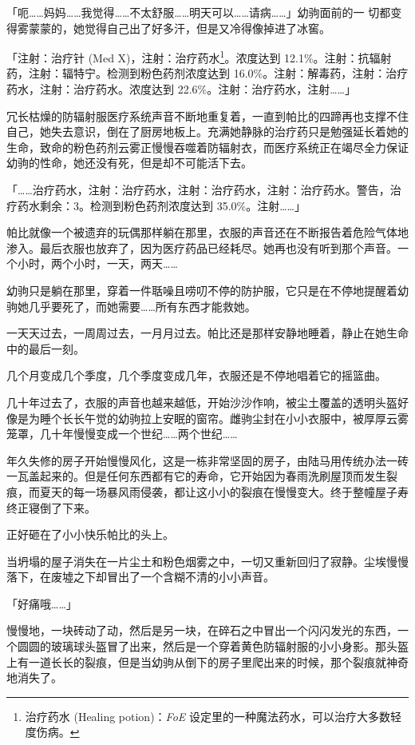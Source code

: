 「呃……妈妈……我觉得……不太舒服……明天可以……请病……」幼驹面前的一
切都变得雾蒙蒙的，她觉得自己出了好多汗，但是又冷得像掉进了冰窖。

「{\mt 注射：治疗针 (Med X)，注射：治疗药水\footnote{治疗药水 (Healing potion)：\emph{FoE} 设定里的一种魔法药水，可以治疗大多数轻度伤病。}。浓度达到 12.1\%。注射：抗辐射药，注射：辐特宁。检测到粉色药剂浓度达到 16.0\%。注射：解毒药，注射：治疗药水，注射：治疗药水。浓度达到 22.6\%。注射：治疗药水，注射……}」

冗长枯燥的防辐射服医疗系统声音不断地重复着，一直到帕比的四蹄再也支撑不住自己，她失去意识，倒在了厨房地板上。充满她静脉的治疗药只是勉强延长着她的生命，致命的粉色药剂云雾正慢慢吞噬着防辐射衣，而医疗系统正在竭尽全力保证幼驹的性命，她还没有死，但是却不可能活下去。

「{\mt ……治疗药水，注射：治疗药水，注射：治疗药水，注射：治疗药水。警告，治疗药水剩余：3。检测到粉色药剂浓度达到 35.0\%。注射……}」

帕比就像一个被遗弃的玩偶那样躺在那里，衣服的声音还在不断报告着危险气体地渗入。最后衣服也放弃了，因为医疗药品已经耗尽。她再也没有听到那个声音。一个小时，两个小时，一天，两天……

幼驹只是躺在那里，穿着一件聒噪且唠叨不停的防护服，它只是在不停地提醒着幼驹她几乎要死了，而她需要……所有东西才能救她。

一天天过去，一周周过去，一月月过去。帕比还是那样安静地睡着，静止在她生命中的最后一刻。

几个月变成几个季度，几个季度变成几年，衣服还是不停地唱着它的摇篮曲。

几十年过去了，衣服的声音也越来越低，开始沙沙作响，被尘土覆盖的透明头盔好像是为睡个长长午觉的幼驹拉上安眠的窗帘。雌驹尘封在小小衣服中，被厚厚云雾笼罩，几十年慢慢变成一个世纪……两个世纪……

年久失修的房子开始慢慢风化，这是一栋非常坚固的房子，由陆马用传统办法一砖一瓦盖起来的。但是任何东西都有它的寿命，它开始因为春雨洗刷屋顶而发生裂痕，而夏天的每一场暴风雨侵袭，都让这小小的裂痕在慢慢变大。终于整幢屋子寿终正寝倒了下来。

正好砸在了小小快乐帕比的头上。

\horizonline


当坍塌的屋子消失在一片尘土和粉色烟雾之中，一切又重新回归了寂静。尘埃慢慢落下，在废墟之下却冒出了一个含糊不清的小小声音。

「好痛哦……」

慢慢地，一块砖动了动，然后是另一块，在碎石之中冒出一个闪闪发光的东西，一个圆圆的玻璃球头盔冒了出来，然后是一个穿着黄色防辐射服的小小身影。那头盔上有一道长长的裂痕，但是当幼驹从倒下的房子里爬出来的时候，那个裂痕就神奇地消失了。

